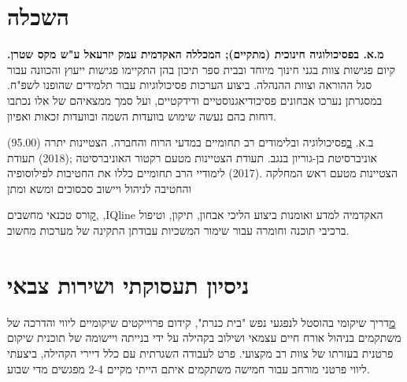 \section{השכלה}

{\textbf{מ.א. בפסיכולוגיה חינוכית (מתקיים); המכללה האקדמית עמק יזרעאל ע"ש מקס שטרן.}}
{קיום פגישות צוות בגני חינוך מיוחד ובבית ספר תיכון בהן התקיימו פגישות ייעוץ והכוונה עבור סגל ההוראה וצוות ההנהלה. 
ביצוע הערכות פסיכולוגיות עבור תלמידים שהופנו לשפ"ח. במסגרתן נערכו אבחונים פסיכודיאגנוסטיים ודידקטיים, ועל סמך ממצאיהם של אלו נכתבו דוחות בהם נעשה שימוש בוועדות השמה ובוועדות זכאות ואפיון. }
{}

{
ב.א.
\href{https://github.com/kiril-u/kiril-resume-2021-1/blob/main/references/BA-and-honorary.pdf}
בפסיכולוגיה ובלימודים רב תחומיים במדעי הרוח והחברה.
הצטיינות יתרה (95.00) אוניברסיטת בן-גוריון בנגב.}
{תעודת הצטיינות מטעם רקטור האוניברסיטה ;(2018) תעודת הצטיינות מטעם ראש המחלקה .(2017)
לימודיי הרב תחומיים כללו את החטיבות לפילוסופיה והחטיבה לניהול ויישוב סכסוכים ומשא ומתן}
{}

\par{\par}

{\href{https://raw.githubusercontent.com/kiril-u/kiril-resume-2021-1/main/references/computer-technitian-certificate.jpg}
קורס טכנאי מחשבים,
,IQline
האקדמיה למדע ואומנות}
{ביצוע הליכי אבחון, תיקון, וטיפול ברכיבי תוכנה וחומרה עבור שימור המשכיות עבודתן התקינה של מערכות מחשוב.}
{}
{}

\section{ניסיון תעסוקתי ושירות צבאי}

{\href{http://www.kidumpro.co.il/}
מדריך שיקומי בהוסטל לנפגעי נפש "בית כנרת", קידום פרוייקטים שיקומיים}
{ליווי והדרכה של משתקמים בניהול אורח חיים עצמאי ושילוב בקהילה על ידי בנייתה ויישומה של תוכנית שיקום פרטנית בעזרתו של צוות רב מקצועי. פרט לעבודה השגרתית עם כלל דיירי הקהילה, ביצעתי ליווי פרטני מורחב עבור חמישה משתקמים איתם הייתי מקיים 2-4 מפגשים מדי שבוע.}
{}

